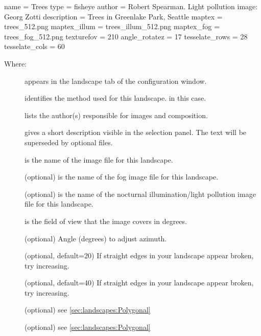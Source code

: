 \begin{configfile}
[landscape]
name = Trees
type = fisheye
author = Robert Spearman. Light pollution image: Georg Zotti
description = Trees in Greenlake Park, Seattle
maptex = trees_512.png
maptex_illum = trees_illum_512.png
maptex_fog = trees_fog_512.png
texturefov = 210
angle_rotatez = 17
tesselate_rows = 28
tesselate_cols = 60
\end{configfile}
Where:
\begin{description}
\item[] appears in the landscape tab of the configuration window.
\item[] identifies the method used for this landscape.  in this case.
\item[] lists the author(s) responsible for images and composition.
\item[] gives a short description visible in the
  selection panel. The text will be superseded by optional
   files.
\item[] is the name of the image file for this landscape.
\item[] (optional) is the name of the fog image file for this landscape.
\item[] (optional) is the name of the nocturnal
  illumination/light pollution image file for this landscape.
\item[] is the field of view that the image covers in degrees.
\item[] (optional) Angle (degrees) to adjust azimuth.
\item[] (optional, default=20) If straight edges
  in your landscape appear broken, try increasing.
\item[] (optional, default=40) If straight edges
  in your landscape appear broken, try increasing.
\item[] (optional) see \ref{sec:landscapes:Polygonal}  %
\item[] (optional) see \ref{sec:landscapes:Polygonal}
%

\end{description}

